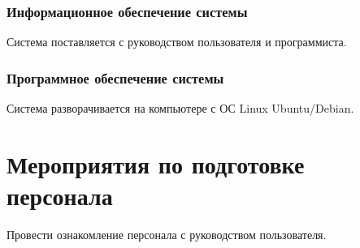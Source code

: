 \subsubsection{Информационное обеспечение системы}

Система поставляется с руководством пользователя и программиста.

\subsubsection{Программное обеспечение системы}

Система разворачивается на компьютере с ОС Linux Ubuntu/Debian.

\section{Мероприятия по подготовке персонала}

Провести ознакомление персонала с руководством пользователя.






